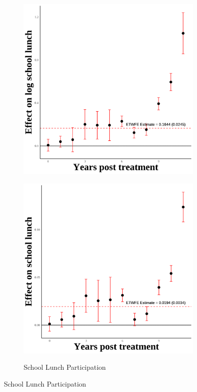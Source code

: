 \documentclass[12pt,english]{article}
\begin{document}
\begin{figure}[H]
\begin{subfigure}[b]{0.3\textwidth}
    \includegraphics[width=\linewidth]{figures/plot02-ln_schl_lunch_event_study.png}
    \label{fig:ln-schl-lunch}
  \end{subfigure}
  \hfill
  \begin{subfigure}[b]{0.3\textwidth}
    \centering
    \caption{School Lunch Participation}
    \includegraphics[width=\linewidth]{figures/plot03-schl_lunch_event_study.png}
    \label{fig:schl-lunch}
  \end{subfigure}


\end{figure}
\end{document}
